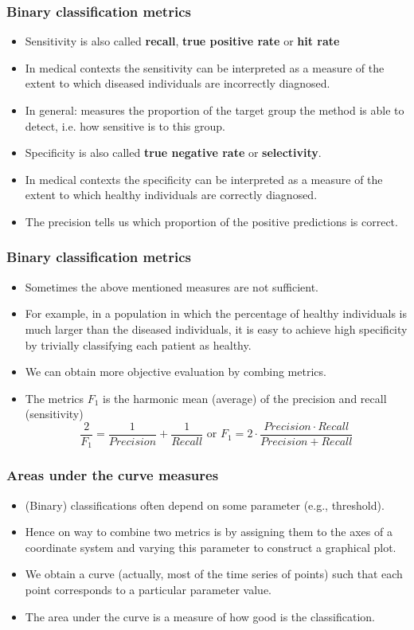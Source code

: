 \documentclass[notes]{beamer}          %
\begin{document}
\begin{frame}
\frametitle{Binary classification metrics}
    \begin{itemize}
        \item Sensitivity is also called {\bf recall}, {\bf true positive rate} or {\bf hit rate}
        \item In medical contexts the sensitivity can be interpreted as a measure of the extent to which diseased individuals are incorrectly diagnosed.
        \item In general: measures the proportion of the target group the method is able to detect, i.e. how sensitive is to this group.
        \item Specificity is also called {\bf true negative rate} or {\bf selectivity}.
        \item In medical contexts the specificity can be interpreted as a measure of the extent to which healthy individuals are correctly diagnosed.
        \item The precision tells us which proportion of the positive predictions is correct.
    \end{itemize}
\end{frame}


\begin{frame}
\frametitle{Binary classification metrics}
    \begin{itemize}
        \item Sometimes the above mentioned measures are not sufficient.
        \item For example, in a population in which the percentage of healthy individuals is much larger than the diseased individuals, it is easy to achieve high specificity by trivially classifying each patient as healthy.
        \item We can obtain more objective evaluation by combing metrics.
        \item The metrics $F_1$ is the harmonic mean (average) of the precision and recall (sensitivity)
        $$
        \frac{2}{F_1} = \frac{1}{Precision}+\frac{1}{Recall} \text{  or  } F_1 = 2 \cdot \frac{Precision \cdot Recall}{Precision+Recall}
        $$
    \end{itemize}
\end{frame}

\begin{frame}
\frametitle{Areas under the curve measures}
    \begin{itemize}
        \item (Binary) classifications often depend on some parameter (e.g., threshold).
        \item Hence on way to combine two metrics is by assigning them to the axes of a coordinate system and varying this parameter to construct a graphical plot.
        \item We obtain a curve (actually, most of the time series of points) such that each point corresponds to a particular parameter value.
        \item The area under the curve is a measure of how good is the classification.
    \end{itemize}
\end{frame}
\end{document}
